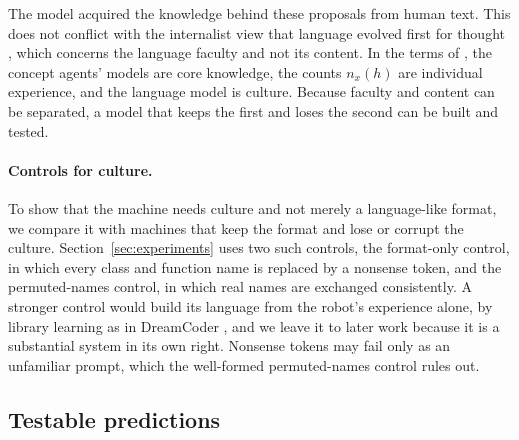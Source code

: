 The model acquired the knowledge behind these proposals from human text. This does not conflict with the
internalist view that language evolved first for thought \cite{berwick2016why, hauser2002faculty}, which concerns
the language faculty and not its content. In the terms of \cite{spelke2007core, tomasello1999cultural}, the concept
agents' models are core knowledge, the counts $n_x(h)$ are individual experience, and the language model is
culture. Because faculty and content can be separated, a model that keeps the first and loses the second can be
built and tested.

\paragraph{Controls for culture.}
\label{sec:inner_speech:library}
To show that the machine needs culture and not merely a language-like format, we compare it with machines that keep
the format and lose or corrupt the culture. Section~\ref{sec:experiments} uses two such controls, the format-only
control, in which every class and function name is replaced by a nonsense token, and the permuted-names control, in
which real names are exchanged consistently. A stronger control would build its language from the robot's
experience alone, by library learning as in DreamCoder \cite{ellis2021dreamcoder}, and we leave it to later work
because it is a substantial system in its own right. Nonsense tokens may fail only as an unfamiliar prompt, which the well-formed permuted-names
control rules out.

\subsection{Testable predictions}
\label{sec:inner_speech:predictions}

